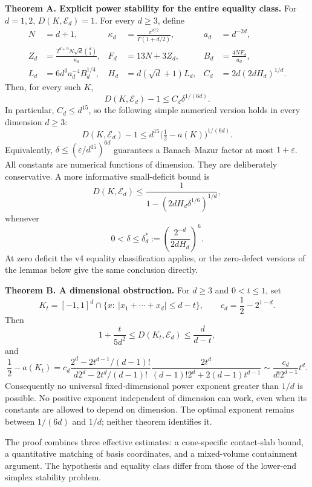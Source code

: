 \documentclass[
  11pt,
]{article}
\begin{document}
\textbf{Theorem A. Explicit power stability for the entire equality
class.} For \(d=1,2\), \(D(K,\mathcal E_d)=1\). For every \(d\ge3\),
define \[
 \begin{aligned}
 N&=d+1, &\kappa_d&=\frac{\pi^{d/2}}{\Gamma(1+d/2)}, &a_d&=d^{-2d},\\
 Z_d&=\frac{2^{d+9}N\sqrt d\binom d3}{\kappa_d},
 &F_d&=13N+3Z_d, & B_d&=\frac{4NF_d}{a_d},\\
 L_d&=6d^3a_d^{-4}B_d^{1/4},
 &H_d&=d(\sqrt d+1)L_d,
 &C_d&=2d(2dH_d)^{1/d}.
 \end{aligned}
\] Then, for every such \(K\), \[
 \boxed{D(K,\mathcal E_d)-1\le C_d\delta^{1/(6d)}.}                 \tag{1.1}
\] In particular, \(C_d\le d^{15}\), so the following simple numerical
version holds in every dimension \(d\ge3\): \[
 \boxed{D(K,\mathcal E_d)-1\le
        d^{15}\bigl(\tfrac12-a(K)\bigr)^{1/(6d)}.}              \tag{1.1a}
\] Equivalently, \(\delta\le(\varepsilon/d^{15})^{6d}\) guarantees a
Banach--Mazur factor at most \(1+\varepsilon\). All constants are
numerical functions of dimension. They are deliberately conservative. A
more informative small-deficit bound is \[
 D(K,\mathcal E_d)
 \le\frac1{1-(2dH_d\delta^{1/6})^{1/d}},                         \tag{1.2}
\] whenever \[
 0<\delta\le\delta_d^*:=
       \left(\frac{2^{-d}}{2dH_d}\right)^6.                       \tag{1.3}
\] At zero deficit the v4 equality classification applies, or the
zero-defect versions of the lemmas below give the same conclusion
directly.

\textbf{Theorem B. A dimensional obstruction.} For \(d\ge3\) and
\(0<t\le1\), set \[
 K_t=[-1,1]^d\cap\{x:\ |x_1+\cdots+x_d|\le d-t\},
 \qquad c_d=\frac12-2^{1-d}.
\] Then \[
 1+\frac{t}{5d^2}\le D(K_t,\mathcal E_d)\le\frac d{d-t},          \tag{1.4}
\] and \[
 \frac12-a(K_t)
 =c_d\frac{2^d-2t^{d-1}/(d-1)!}{d2^d-2t^d/(d-1)!}
       \frac{2t^d}{(d-1)!2^d+2(d-1)t^{d-1}}
 \sim\frac{c_d}{d!2^{d-1}}t^d.                                  \tag{1.5}
\] Consequently no universal fixed-dimensional power exponent greater
than \(1/d\) is possible. No positive exponent independent of dimension
can work, even when its constants are allowed to depend on dimension.
The optimal exponent remains between \(1/(6d)\) and \(1/d\); neither
theorem identifies it.

The proof combines three effective estimates: a cone-specific
contact-slab bound, a quantitative matching of basis coordinates, and a
mixed-volume containment argument. The hypothesis and equality class
differ from those of the lower-end simplex stability problem.
\end{document}
